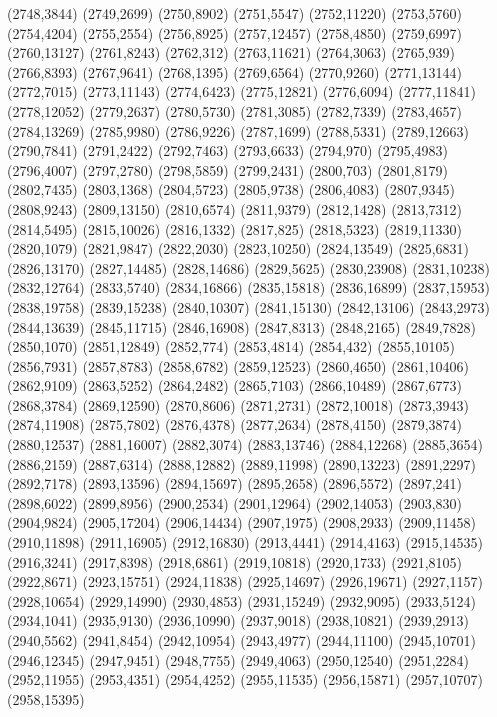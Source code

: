 (2748,3844)
(2749,2699)
(2750,8902)
(2751,5547)
(2752,11220)
(2753,5760)
(2754,4204)
(2755,2554)
(2756,8925)
(2757,12457)
(2758,4850)
(2759,6997)
(2760,13127)
(2761,8243)
(2762,312)
(2763,11621)
(2764,3063)
(2765,939)
(2766,8393)
(2767,9641)
(2768,1395)
(2769,6564)
(2770,9260)
(2771,13144)
(2772,7015)
(2773,11143)
(2774,6423)
(2775,12821)
(2776,6094)
(2777,11841)
(2778,12052)
(2779,2637)
(2780,5730)
(2781,3085)
(2782,7339)
(2783,4657)
(2784,13269)
(2785,9980)
(2786,9226)
(2787,1699)
(2788,5331)
(2789,12663)
(2790,7841)
(2791,2422)
(2792,7463)
(2793,6633)
(2794,970)
(2795,4983)
(2796,4007)
(2797,2780)
(2798,5859)
(2799,2431)
(2800,703)
(2801,8179)
(2802,7435)
(2803,1368)
(2804,5723)
(2805,9738)
(2806,4083)
(2807,9345)
(2808,9243)
(2809,13150)
(2810,6574)
(2811,9379)
(2812,1428)
(2813,7312)
(2814,5495)
(2815,10026)
(2816,1332)
(2817,825)
(2818,5323)
(2819,11330)
(2820,1079)
(2821,9847)
(2822,2030)
(2823,10250)
(2824,13549)
(2825,6831)
(2826,13170)
(2827,14485)
(2828,14686)
(2829,5625)
(2830,23908)
(2831,10238)
(2832,12764)
(2833,5740)
(2834,16866)
(2835,15818)
(2836,16899)
(2837,15953)
(2838,19758)
(2839,15238)
(2840,10307)
(2841,15130)
(2842,13106)
(2843,2973)
(2844,13639)
(2845,11715)
(2846,16908)
(2847,8313)
(2848,2165)
(2849,7828)
(2850,1070)
(2851,12849)
(2852,774)
(2853,4814)
(2854,432)
(2855,10105)
(2856,7931)
(2857,8783)
(2858,6782)
(2859,12523)
(2860,4650)
(2861,10406)
(2862,9109)
(2863,5252)
(2864,2482)
(2865,7103)
(2866,10489)
(2867,6773)
(2868,3784)
(2869,12590)
(2870,8606)
(2871,2731)
(2872,10018)
(2873,3943)
(2874,11908)
(2875,7802)
(2876,4378)
(2877,2634)
(2878,4150)
(2879,3874)
(2880,12537)
(2881,16007)
(2882,3074)
(2883,13746)
(2884,12268)
(2885,3654)
(2886,2159)
(2887,6314)
(2888,12882)
(2889,11998)
(2890,13223)
(2891,2297)
(2892,7178)
(2893,13596)
(2894,15697)
(2895,2658)
(2896,5572)
(2897,241)
(2898,6022)
(2899,8956)
(2900,2534)
(2901,12964)
(2902,14053)
(2903,830)
(2904,9824)
(2905,17204)
(2906,14434)
(2907,1975)
(2908,2933)
(2909,11458)
(2910,11898)
(2911,16905)
(2912,16830)
(2913,4441)
(2914,4163)
(2915,14535)
(2916,3241)
(2917,8398)
(2918,6861)
(2919,10818)
(2920,1733)
(2921,8105)
(2922,8671)
(2923,15751)
(2924,11838)
(2925,14697)
(2926,19671)
(2927,1157)
(2928,10654)
(2929,14990)
(2930,4853)
(2931,15249)
(2932,9095)
(2933,5124)
(2934,1041)
(2935,9130)
(2936,10990)
(2937,9018)
(2938,10821)
(2939,2913)
(2940,5562)
(2941,8454)
(2942,10954)
(2943,4977)
(2944,11100)
(2945,10701)
(2946,12345)
(2947,9451)
(2948,7755)
(2949,4063)
(2950,12540)
(2951,2284)
(2952,11955)
(2953,4351)
(2954,4252)
(2955,11535)
(2956,15871)
(2957,10707)
(2958,15395)
